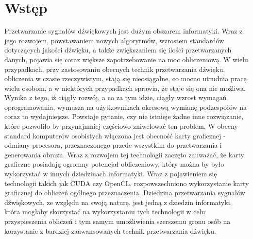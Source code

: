 \chapter*{Wstęp}

Przetwarzanie sygnałów dźwiękowych jest dużym obszarem informatyki. Wraz z jego rozwojem, powstawaniem nowych algorytmów, wzrostem standardów dotyczących jakości dźwięku, a także zwiększaniem się ilości przetwarzanych danych, pojawia się coraz większe zapotrzebowanie na moc obliczeniową. W wielu przypadkach, przy zastosowaniu obecnych technik przetwarzania dźwięku, obliczenia w czasie rzeczywistym, stają się nieosiągalne, co mocno utrudnia pracę wielu osobom, a w niektórych przypadkach sprawia, że staje się ona nie możliwa. Wynika z tego, iż ciągły rozwój, a co za tym idzie, ciągły wzrost wymagań oprogramowania, wymusza na użytkownikach okresową wymianę podzespołów na coraz to wydajniejsze. Powstaje pytanie, czy nie istnieje żadne inne rozwiązanie, które pozwoliło by przynajmniej częściowo zniwelować ten problem. W obecny standard komputerów osobistych włączona jest obecność karty graficznej - odmiany procesora, przeznaczonego przede wszystkim do przetwarzania i generowania obrazu. Wraz z rozwojem tej technologii zaczęto zauważać, że karty graficzne posiadają ogromny potencjał obliczeniowy, który można by było wykorzystać w innych dziedzinach informatyki. Wraz z pojawieniem się technologii takich jak CUDA czy OpenCL, rozpowszechniono wykorzystanie karty graficznej do obliczeń ogólnego przeznaczenia. Dziedzina przetwarzania sygnałów dźwiękowych, ze względu na swoją naturę, jest jedną z dziedzin informatyki, która mogłaby skorzystać na wykorzystaniu tych technologii w celu przyspieszenia obliczeń i tym samym umożliwienia szerszemu gronu osób na korzystanie z bardziej zaawansowanych technik przetwarzania dźwięku.
